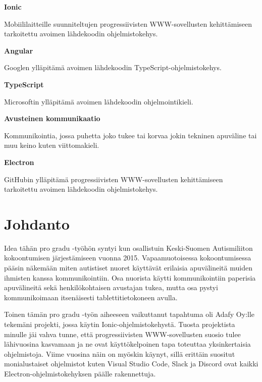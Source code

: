 \documentclass[utf8]{gradu3}
\begin{document}
\begin{thetermlist}
\item[\textbf{Ionic}] 

Mobiililaitteille suunniteltujen progressiivisten WWW-sovellusten kehittämiseen tarkoitettu avoimen lähdekoodin ohjelmistokehys.

\item[\textbf{Angular}] 

Googlen ylläpitämä avoimen lähdekoodin TypeScript-ohjelmistokehys.

\item[\textbf{TypeScript}] 

Microsoftin ylläpitämä avoimen lähdekoodin ohjelmointikieli.

\item[\textbf{Avusteinen kommunikaatio}]

 Kommunikointia, jossa puhetta joko tukee tai korvaa jokin tekninen apuväline tai muu keino kuten viittomakieli.

\item[\textbf{Electron}] 

GitHubin ylläpitämä progressiivisten WWW-sovellusten kehittämiseen tarkoitettu avoimen lähdekoodin ohjelmistokehys.

\end{thetermlist}

\mainmatter

\chapter{Johdanto}

Idea tähän pro gradu -työhön syntyi kun osallistuin Keski-Suomen Autismiliiton kokoontumisen järjestämiseen vuonna 2015. Vapaamuotoisessa kokoontumisessa pääsin näkemään miten autistiset nuoret käyttävät erilaisia apuvälineitä muiden ihmisten kanssa kommunikointiin. Osa nuorista käytti kommunikointiin paperisia apuvälineitä sekä henkilökohtaisen avustajan tukea, mutta osa pystyi kommunikoimaan itsenäisesti tablettitietokoneen avulla.

Toinen tämän pro gradu -työn aiheeseen vaikuttanut tapahtuma oli Adafy Oy:lle tekemäni projekti, jossa käytin Ionic-ohjelmistokehystä. Tuosta projektista minulle jäi vahva tunne, että progressiivisten WWW-sovellusten suosio tulee lähivuosina kasvamaan ja ne ovat käyttökelpoinen tapa toteuttaa yksinkertaisia ohjelmistoja. Viime vuosina näin on myöskin käynyt, sillä erittäin suositut monialustaiset ohjelmistot kuten Visual Studio Code, Slack ja Discord ovat kaikki Electron-ohjelmistokehyksen päälle rakennettuja.
\end{document}
